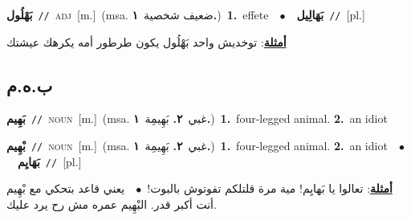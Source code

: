 \documentclass[10pt,a4paper,twoside]{article} %
\begin{document}
\begin{multicols}{2}
{\setlength\topsep{0pt}\textbf{\foreignlanguage{arabic}{بَهْلُول}}\ {\color{gray}\texttt{//}\color{black}}\ \textsc{adj}\ [m.]\ \color{gray}(msa. \foreignlanguage{arabic}{ضعيف شخصية}~\foreignlanguage{arabic}{\textbf{١.}})\color{black}\ \textbf{1.}~effete\ \ $\bullet$\ \ \setlength\topsep{0pt}\textbf{\foreignlanguage{arabic}{بَهَالِيل}}\ {\color{gray}\texttt{//}\color{black}}\ [pl.]\  \begin{flushright}\color{gray}\foreignlanguage{arabic}{\textbf{\underline{\foreignlanguage{arabic}{أمثلة}}}: توخديش واحد بَهْلُول يكون طرطور أمه يكرهك عيشتك}\end{flushright}\color{black}} \vspace{2mm}

\vspace{-3mm}
\subsection*{\color{blue}\foreignlanguage{arabic}{ب.ه.م}\color{blue}{}} 

{\setlength\topsep{0pt}\textbf{\foreignlanguage{arabic}{بَهِيم}}\ {\color{gray}\texttt{//}\color{black}}\ \textsc{noun}\ [m.]\ \color{gray}(msa. \foreignlanguage{arabic}{غبي}~\foreignlanguage{arabic}{\textbf{٢.}}  \foreignlanguage{arabic}{بَهِيمِة}~\foreignlanguage{arabic}{\textbf{١.}})\color{black}\ \textbf{1.}~four-legged animal.  \textbf{2.}~an idiot\ } \vspace{2mm}

{\setlength\topsep{0pt}\textbf{\foreignlanguage{arabic}{بْهِيم}}\ {\color{gray}\texttt{//}\color{black}}\ \textsc{noun}\ [m.]\ \color{gray}(msa. \foreignlanguage{arabic}{غبي}~\foreignlanguage{arabic}{\textbf{٢.}}  \foreignlanguage{arabic}{بَهِيمِة}~\foreignlanguage{arabic}{\textbf{١.}})\color{black}\ \textbf{1.}~four-legged animal.  \textbf{2.}~an idiot\ \ $\bullet$\ \ \setlength\topsep{0pt}\textbf{\foreignlanguage{arabic}{بَهَايِم}}\ {\color{gray}\texttt{//}\color{black}}\ [pl.]\  \begin{flushright}\color{gray}\foreignlanguage{arabic}{\textbf{\underline{\foreignlanguage{arabic}{أمثلة}}}: تعالوا يا بَهايِم! مية مرة قلتلكم تفوتوش بالبوت!\ $\bullet$\ \  يعني قاعد بتحكي مع بْهِيم أنت أكبر قدر. البْهِيم عمره مش رح يرد عليك.}\end{flushright}\color{black}} \vspace{2mm}


\end{multicols}
\end{document}
